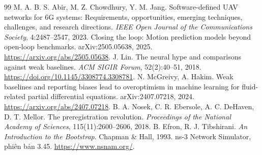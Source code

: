 \documentclass[11pt,a4paper]{article}
\begin{document}
\begin{thebibliography}{99}
 M. A. B. S. Abir, M. Z. Chowdhury, Y. M. Jang.
Software-defined UAV networks for 6G systems: Requirements, opportunities,
emerging techniques, challenges, and research directions.
\textit{IEEE Open Journal of the Communications Society}, 4:2487--2547, 2023.
 Closing the loop: Motion prediction models beyond
open-loop benchmarks. arXiv:2505.05638, 2025.
\url{https://arxiv.org/abs/2505.05638}.
 J. Lin.
The neural hype and comparisons against weak baselines.
\textit{ACM SIGIR Forum}, 52(2):40--51, 2018.
\url{https://doi.org/10.1145/3308774.3308781}.
 N. McGreivy, A. Hakim.
Weak baselines and reporting biases lead to overoptimism in machine learning
for fluid-related partial differential equations.
arXiv:2407.07218, 2024. \url{https://arxiv.org/abs/2407.07218}.
 B. A. Nosek, C. R. Ebersole, A. C. DeHaven, D. T. Mellor.
The preregistration revolution.
\textit{Proceedings of the National Academy of Sciences}, 115(11):2600--2606, 2018.
 B. Efron, R. J. Tibshirani.
\textit{An Introduction to the Bootstrap}. Chapman \& Hall, 1993.
 ns-3 Network Simulator, phiên bản 3.45. \url{https://www.nsnam.org/}.
\end{thebibliography}
\end{document}
